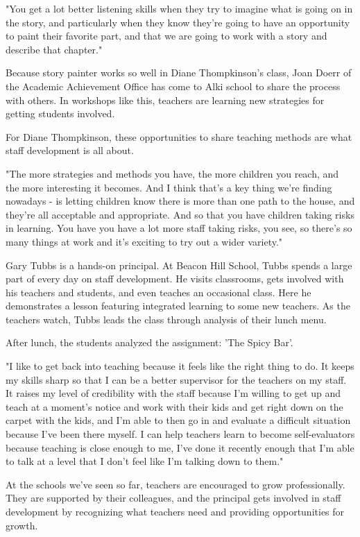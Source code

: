 "You get a lot better listening skills when they try to imagine what is going on in the story, and particularly when they know they're going to have an opportunity to paint their favorite part, and that we are going to work with a story and describe that chapter."

Because story painter works so well in Diane Thompkinson's class, Joan Doerr of the Academic Achievement Office has come to Alki school to share the process with others. In workshops like this, teachers are learning new strategies for getting students involved.

For Diane Thompkinson, these opportunities to share teaching methods are what staff development is all about.

"The more strategies and methods you have, the more children you reach, and the more interesting it becomes. And I think that's a key thing we're finding nowadays - is letting children know there is more than one path to the house, and they're all acceptable and appropriate. And so that you have children taking risks in learning. You have you have a lot more staff taking risks, you see, so there's so many things at work and it's exciting to try out a wider variety."

Gary Tubbs is a hands-on principal. At Beacon Hill School, Tubbs spends a large part of every day on staff development. He visits classrooms, gets involved with his teachers and students, and even teaches an occasional class. Here he demonstrates a lesson featuring integrated learning to some new teachers. As the teachers watch, Tubbs leads the class through analysis of their lunch menu.

After lunch, the students analyzed the assignment: 'The Spicy Bar'.

"I like to get back into teaching because it feels like the right thing to do. It keeps my skills sharp so that I can be a better supervisor for the teachers on my staff. It raises my level of credibility with the staff because I'm willing to get up and teach at a moment's notice and work with their kids and get right down on the carpet with the kids, and I'm able to then go in and evaluate a difficult situation because I've been there myself. I can help teachers learn to become self-evaluators because teaching is close enough to me, I've done it recently enough that I'm able to talk at a level that I don't feel like I'm talking down to them."

At the schools we've seen so far, teachers are encouraged to grow professionally. They are supported by their colleagues, and the principal gets involved in staff development by recognizing what teachers need and providing opportunities for growth.

